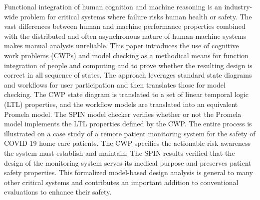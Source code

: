 Functional integration of human cognition and machine reasoning is an industry-wide problem for critical systems where failure risks human health or safety. The vast differences between human and machine performance properties combined with the distributed and often asynchronous nature of human-machine systems makes manual analysis unreliable. This paper introduces the use of cognitive work problems (CWPs) and model checking as a methodical means for function integration of people and computing and to prove whether the resulting design is correct in all sequence of states. The approach leverages standard state diagrams and workflows for user participation and then translates those for model checking. The CWP state diagram is translated to a set of linear temporal logic (LTL) properties, and the workflow models are translated into an equivalent Promela model. The SPIN model checker verifies whether or not the Promela model implements the LTL properties defined by the CWP. The entire process is illustrated on a case study of a remote patient monitoring system for the safety of COVID-19 home care patients. The CWP specifies the actionable risk awareness the system must establish and maintain. The SPIN results verified that the design of the monitoring system serves its medical purpose and preserves patient safety properties. This formalized model-based design analysis is general to many other critical systems and contributes an important addition to conventional evaluations to enhance their safety.

\begin{comment}
Remote health-care that integrates human and machine intelligence for patient monitoring is an active area of research. These systems must take extra precautions for safety since the patients are not in the direct supervision of medical providers. This paper details the application of model checking to the Bionous \phware\ remote patient monitoring system to prove it preserves patient safety properties. Patient safety requirements are formalized in a cognitive work problem that is translated to Linear Temporal Logic properties. A cognitive work problem (CWP) is a computationally independent model stating what a system must accomplish. In this example, the system must take action on risk awareness to enhance patient safety, so the CWP defines risk awareness and requisite decisions given the current risk. The \phware\ workflow is translated to Promela to model the asynchronous behaviors of the patient at home, the artificial intelligence in the cloud, and the clinicians. The LTL and Promela models with added behaviors for patient severity are given to the SPIN model checker to prove the system implements the cognitive work problem, meaning it acts appropriately in regards to risk awareness. This result is an important contribution to conventional evaluations and contributes to the assurance of patient safety in remote health IT.
\end{comment}